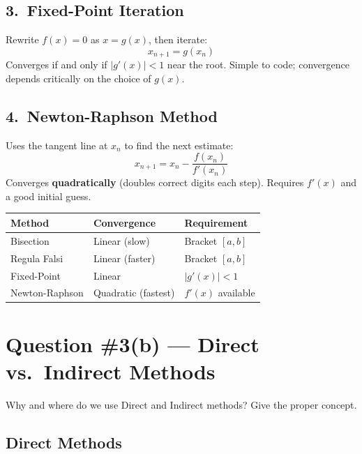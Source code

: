 \documentclass[12pt]{article}
\begin{document}
\vspace{6pt}
\subsection*{3.\ Fixed-Point Iteration}

Rewrite $f(x)=0$ as $x = g(x)$, then iterate:
\[
  x_{n+1} = g(x_n)
\]
Converges if and only if $|g'(x)| < 1$ near the root. Simple to code; convergence depends critically on the choice of $g(x)$.

\vspace{6pt}
\subsection*{4.\ Newton-Raphson Method}

Uses the tangent line at $x_n$ to find the next estimate:
\[
  x_{n+1} = x_n - \frac{f(x_n)}{f'(x_n)}
\]
Converges \textbf{quadratically} (doubles correct digits each step). Requires $f'(x)$ and a good initial guess.

\begin{observebox}
\begin{tabular}{p{3.5cm} p{3.5cm} p{4cm}}
\textbf{Method} & \textbf{Convergence} & \textbf{Requirement} \\
\hline
Bisection & Linear (slow) & Bracket $[a,b]$ \\
Regula Falsi & Linear (faster) & Bracket $[a,b]$ \\
Fixed-Point & Linear & $|g'(x)|<1$ \\
Newton-Raphson & Quadratic (fastest) & $f'(x)$ available \\
\end{tabular}
\end{observebox}

\newpage

\section{Question \#3(b) --- Direct vs.\ Indirect Methods}

\begin{problembox}
Why and where do we use Direct and Indirect methods? Give the proper concept.
\end{problembox}

\subsection*{Direct Methods}
\end{document}

